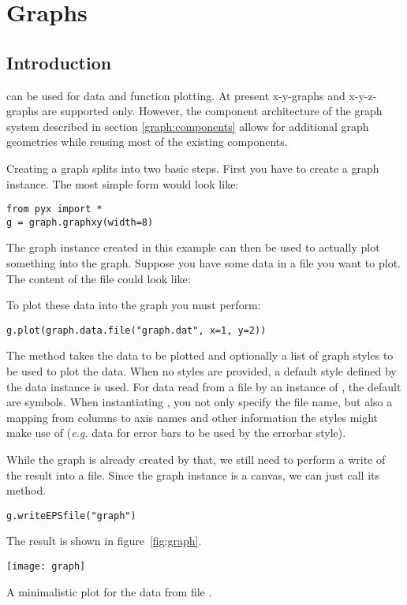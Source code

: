 \chapter{Graphs}
\label{graph}

\section{Introduction} %
\PyX{} can be used for data and function plotting. At present
x-y-graphs and x-y-z-graphs are supported only. However, the component
architecture of the graph system described in section
\ref{graph:components} allows for additional graph geometries while
reusing most of the existing components.

Creating a graph splits into two basic steps. First you have to create
a graph instance. The most simple form would look like:
\begin{verbatim}
from pyx import *
g = graph.graphxy(width=8)
\end{verbatim}
The graph instance  created in this example can then be used
to actually plot something into the graph. Suppose you have some data
in a file  you want to plot. The content of the file
could look like:

To plot these data into the graph  you must perform:
\begin{verbatim}
g.plot(graph.data.file("graph.dat", x=1, y=2))
\end{verbatim}
The method  takes the data to be plotted and optionally
a list of graph styles to be used to plot the data. When no styles are
provided, a default style defined by the data instance is used. For
data read from a file by an instance of , the
default are symbols. When instantiating , you
not only specify the file name, but also a mapping from columns to
axis names and other information the styles might make use of
(\emph{e.g.} data for error bars to be used by the errorbar style).

While the graph is already created by that, we still need to perform a
write of the result into a file. Since the graph instance is a canvas,
we can just call its  method.
\begin{verbatim}
g.writeEPSfile("graph")
\end{verbatim}
The result  is shown in figure~\ref{fig:graph}.

\texttt{[image: graph]}
\centerline{A minimalistic plot for the data from file .}

